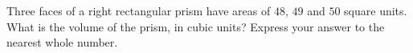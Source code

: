 Three faces of a right rectangular prism have areas of $48$, $49$ and $50$ square units. What is the volume of the prism, in cubic units? Express your answer to the nearest whole number.
